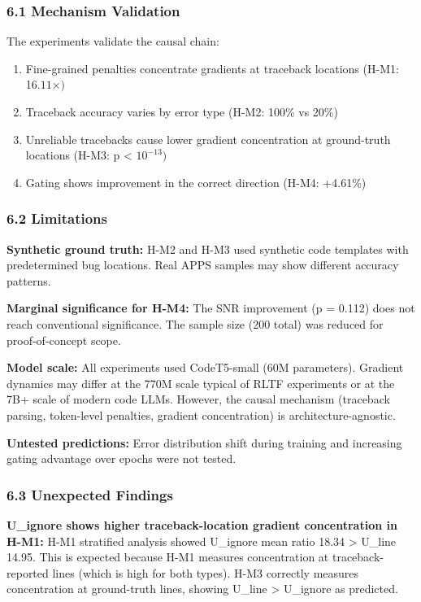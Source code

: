 
\subsubsection{6.1 Mechanism Validation}

The experiments validate the causal chain:

\begin{enumerate}
\item Fine-grained penalties concentrate gradients at traceback locations (H-M1: 16.$11\times )$
\item Traceback accuracy varies by error type (H-M2: 100\% vs 20\%)
\item Unreliable tracebacks cause lower gradient concentration at ground-truth locations (H-M3: p < $10^{-13})$
\item Gating shows improvement in the correct direction (H-M4: +4.61\%)
\end{enumerate}

\subsubsection{6.2 Limitations}

\textbf{Synthetic ground truth:} H-M2 and H-M3 used synthetic code templates with predetermined bug locations. Real APPS samples may show different accuracy patterns.

\textbf{Marginal significance for H-M4:} The SNR improvement (p = 0.112) does not reach conventional significance. The sample size (200 total) was reduced for proof-of-concept scope.

\textbf{Model scale:} All experiments used CodeT5-small (60M parameters). Gradient dynamics may differ at the 770M scale typical of RLTF experiments or at the 7B+ scale of modern code LLMs. However, the causal mechanism (traceback parsing, token-level penalties, gradient concentration) is architecture-agnostic.

\textbf{Untested predictions:} Error distribution shift during training and increasing gating advantage over epochs were not tested.

\subsubsection{6.3 Unexpected Findings}

\textbf{U\_ignore shows higher traceback-location gradient concentration in H-M1:} H-M1 stratified analysis showed U\_ignore mean ratio 18.34 > U\_line 14.95. This is expected because H-M1 measures concentration at traceback-reported lines (which is high for both types). H-M3 correctly measures concentration at ground-truth lines, showing U\_line > U\_ignore as predicted.

